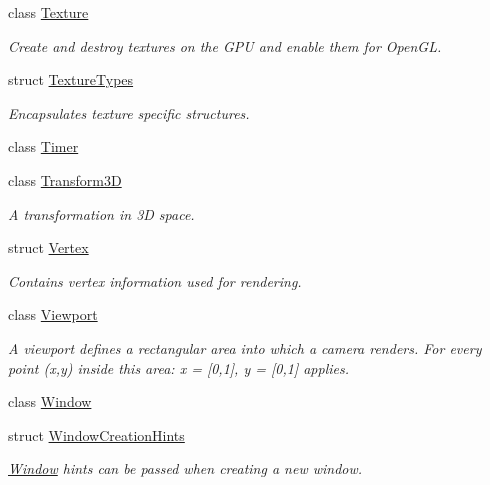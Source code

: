 \begin{DoxyCompactItemize}
\item 
class \mbox{\hyperlink{classec_1_1_texture}{Texture}}
\begin{DoxyCompactList}\small\item\em Create and destroy textures on the G\+PU and enable them for Open\+GL. \end{DoxyCompactList}\item 
struct \mbox{\hyperlink{structec_1_1_texture_types}{Texture\+Types}}
\begin{DoxyCompactList}\small\item\em Encapsulates texture specific structures. \end{DoxyCompactList}\item 
class \mbox{\hyperlink{classec_1_1_timer}{Timer}}
\item 
class \mbox{\hyperlink{classec_1_1_transform3_d}{Transform3D}}
\begin{DoxyCompactList}\small\item\em A transformation in 3D space. \end{DoxyCompactList}\item 
struct \mbox{\hyperlink{structec_1_1_vertex}{Vertex}}
\begin{DoxyCompactList}\small\item\em Contains vertex information used for rendering. \end{DoxyCompactList}\item 
class \mbox{\hyperlink{classec_1_1_viewport}{Viewport}}
\begin{DoxyCompactList}\small\item\em A viewport defines a rectangular area into which a camera renders. For every point (x,y) inside this area\+: x = \mbox{[}0,1\mbox{]}, y = \mbox{[}0,1\mbox{]} applies. \end{DoxyCompactList}\item 
class \mbox{\hyperlink{classec_1_1_window}{Window}}
\item 
struct \mbox{\hyperlink{structec_1_1_window_creation_hints}{Window\+Creation\+Hints}}
\begin{DoxyCompactList}\small\item\em \mbox{\hyperlink{classec_1_1_window}{Window}} hints can be passed when creating a new window. \end{DoxyCompactList}\end{DoxyCompactItemize}
